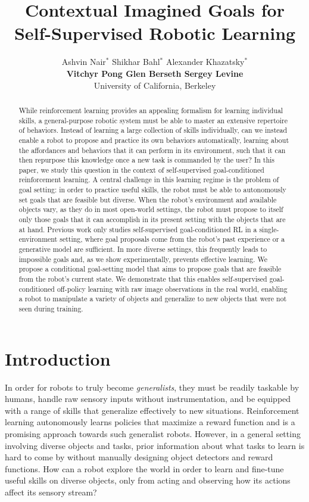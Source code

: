 \documentclass{article}
\title{Contextual Imagined Goals for Self-Supervised Robotic Learning}
\author{Ashvin Nair$^*$ \hspace{6mm} Shikhar Bahl$^*$ \hspace{2mm} Alexander Khazatsky$^*$ \\ \textbf{Vitchyr Pong \hspace{8mm} Glen Berseth \hspace{8mm} Sergey Levine \hspace{4mm} } \\
\footnotesize{University of California, Berkeley}
}
\begin{document}
\maketitle

\begin{abstract}
While reinforcement learning provides an appealing formalism for learning individual skills, a general-purpose robotic system must be able to master an extensive repertoire of behaviors. Instead of learning a large collection of skills individually, can we instead enable a robot to propose and practice its own behaviors automatically, learning about the affordances and behaviors that it can perform in its environment, such that it can then repurpose this knowledge once a new task is commanded by the user? In this paper, we study this question in the context of self-supervised goal-conditioned reinforcement learning. A central challenge in this learning regime is the problem of goal setting: in order to practice useful skills, the robot must be able to autonomously set goals that are feasible but diverse. When the robot's environment and available objects vary, as they do in most open-world settings, the robot must propose to itself only those goals that it can accomplish in its present setting with the objects that are at hand. Previous work only studies self-supervised goal-conditioned RL in a single-environment setting, where goal proposals come from the robot's past experience or a generative model are sufficient. In more diverse settings, this frequently leads to impossible goals and, as we show experimentally, prevents effective learning. We propose a conditional goal-setting model that aims to propose goals that are feasible from the robot's current state. We demonstrate that this enables self-supervised goal-conditioned off-policy learning with raw image observations in the real world, enabling a robot to manipulate a variety of objects and generalize to new objects that were not seen during training.
\end{abstract}


\section{Introduction}

In order for robots to truly become \emph{generalists}, they must be readily taskable by humans, handle raw sensory inputs without instrumentation, and be equipped with a range of skills that generalize effectively to new situations.
Reinforcement learning autonomously learns policies that maximize a reward function and is a promising approach towards such generalist robots. However, in a general setting involving diverse objects and tasks, prior information about what tasks to learn is hard to come by without manually designing object detectors and reward functions.
How can a robot explore the world in order to learn and fine-tune useful skills on diverse objects, only from acting and observing how its actions affect its sensory stream?
\end{document}
